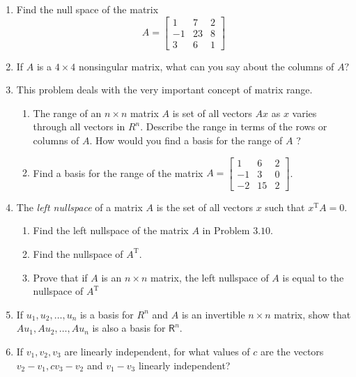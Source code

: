 \documentclass[../main.tex]{subfiles}
\begin{document}
\begin{enumerate}[label=\textbf{3.\arabic*}, noitemsep]
\item Find the null space of the matrix
$$
A=\left[\begin{array}{ccc}
1 & 7 & 2 \\
-1 & 23 & 8 \\
3 & 6 & 1
\end{array}\right]
$$

\item If $A$ is a $4 \times 4$ nonsingular matrix, what can you say about the columns of $A ?$

\item This problem deals with the very important concept of matrix range.
	\begin{enumerate}[label=\textbf{\alph*. }, noitemsep]
	\item The range of an $n \times n$ matrix $A$ is set of all vectors $A x$ as $x$ varies through all vectors in $R^{n} .$ Describe the range in terms of the rows or columns of $A$. How would you find a basis for the range of $A$ ?
	\item Find a basis for the range of the matrix $A=\left[\begin{array}{ccc}1 & 6 & 2 \\ -1 & 3 & 0 \\ -2 & 15 & 2\end{array}\right]$.
	\end{enumerate}

\item The \emph{left nullspace} of a matrix $A$ is the set of all vectors $x$ such that $x^{\mathrm{T}} A=0 .$
	\begin{enumerate}[label=\textbf{\alph*. }, noitemsep]
	\item Find the left nullspace of the matrix $A$ in Problem $3.10$.
	\item Find the nullspace of $A^{\mathrm{T}}$.
	\item Prove that if $A$ is an $n \times n$ matrix, the left nullspace of $A$ is equal to the nullspace of $A^{\mathrm{T}}$
	\end{enumerate}

\item If $u_{1}, u_{2}, \ldots, u_{n}$ is a basis for $R^{n}$ and $A$ is an invertible $n \times n$ matrix, show that $A u_{1}, A u_{2}, \ldots, A u_{n}$ is also a basis for $\mathsf{R}^{n}$.

\item If $v_{1}, v_{2}, v_{3}$ are linearly independent, for what values of $c$ are the vectors $v_{2}-v_{1}, c v_{3}-v_{2}$ and $v_{1}-v_{3}$ linearly independent?


\end{enumerate}
\end{document}
